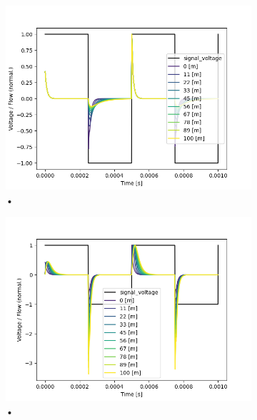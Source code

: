 \documentclass[fontsize=12pt, a4paper]{scrartcl}
\begin{document}
\begin{figure}[H]
	\centering
	\begin{subfigure}[H]{0.48\textwidth}
		\includegraphics[width=\textwidth, valign=t]{bilder/tubelength/tl_in_branch_multisweep_flow.png}
		\caption{•}
	\end{subfigure}
	\begin{subfigure}[H]{0.48\textwidth}
	\includegraphics[width=\textwidth, valign=t]{bilder/tubelength/tl_out_branch_multisweep_flow.png}
	\caption{•}
	\end{subfigure}
	\begin{subfigure}[H]{0.48\textwidth}

\end{subfigure}
\end{figure}
\end{document}
